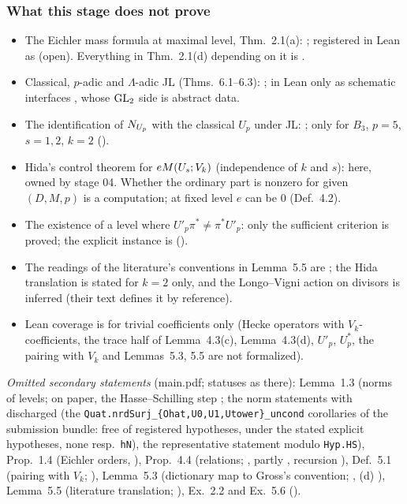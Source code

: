 \subsubsection*{What this stage does not prove}
\begin{itemize}
\item The Eichler mass formula at maximal level, Thm.~2.1(a): \stcited{} \cite[Thm.~25.1.1]{Vo}; registered in Lean as
   (open). Everything in Thm.~2.1(d) depending on it is \stpmc.
\item Classical, $p$-adic and $\Lambda$-adic JL (Thms.~6.1--6.3): \stcited; in Lean only as schematic interfaces
  ,  whose $\mathrm{GL}_2$ side is abstract data.
\item The identification of $N_{U_p}$ with the classical $U_p$ under JL: \stexp{}; \stcomp{} only for $B_3$, $p=5$, $s=1,2$, $k=2$
  ().
\item Hida's control theorem for $eM(U_s;V_k)$ (independence of $k$ and $s$): \stexp{} here, owned by stage 04. Whether the
  ordinary part is nonzero for given $(D,M,p)$ is a computation; at fixed level $e$ can be $0$ (Def.~4.2).
\item The existence of a level where $U'_p\pi^*\ne\pi^*U'_p$: only the sufficient criterion is proved; the explicit instance is
  \stcomp{} ().
\item The readings of the literature's conventions in Lemma~5.5 are \stcited{}; the Hida translation is stated for $k=2$ only, and the
  Longo--Vigni action on divisors is inferred (their text defines it by reference).
\item Lean coverage is for trivial coefficients only (Hecke operators with $V_k$-coefficients, the trace half of Lemma~4.3(c), Lemma~4.3(d),
  $U'_p$, $U_p^*$, the pairing with $V_k$ and Lemmas~5.3, 5.5 are not formalized).
\end{itemize}
\noindent\emph{Omitted secondary statements} (main.pdf; statuses as there): Lemma~1.3 (norms of levels; \stproved{} on paper, the
Hasse--Schilling step \stcited{} \cite[Main Thm.~14.7.4]{Vo}; the norm statements \stformal{} with  discharged (the \texttt{Quat.nrdSurj\_\{Ohat,U0,U1,Utower\}\_uncond} corollaries of the submission bundle: free of registered hypotheses, under the stated explicit hypotheses, none resp.\ \texttt{hN}), the
representative statement modulo \texttt{Hyp.HS}), Prop.~1.4 (Eichler orders, \stknown{} \cite[Prop.~23.4.3]{Vo}), Prop.~4.4 (relations;
\stproved, partly \stformal, recursion \stknown), Def.~5.1 (pairing with $V_k$; \stproved), Lemma~5.3 (dictionary map to Gross's
convention; \stproved, (d) \stcited{} \cite[Prop.~6.9]{Gr99}), Lemma~5.5 (literature translation; \stpmc), Ex.~2.2 and Ex.~5.6 (\stpmc).
\par\endgroup
